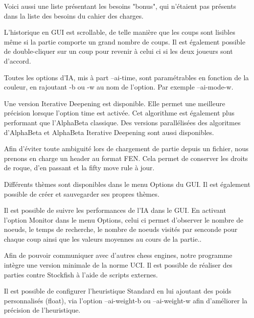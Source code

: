 \documentclass{article}
\begin{document}
Voici aussi une liste présentant les besoins "bonus", qui n'étaient pas présents dans la liste des besoins du cahier des charges.

\begin{needbox}
    L'historique en GUI est scrollable, de telle manière que les coups sont lisibles même si la partie
    comporte un grand nombre de coups. Il est également possible de double-cliquer sur un coup pour revenir à celui ci si les deux joueurs sont d'accord.
\end{needbox}

\begin{needbox}[F62: IA paramétrable]
   Toutes les options d'IA, mis à part --ai-time, sont paramétrables en fonction de la couleur, en rajoutant 
   -b ou -w au nom de l'option. Par exemple --ai-mode-w.
\end{needbox}

\begin{needbox}
   Une version Iterative Deepening est disponible. Elle permet une meilleure précision lorsque l'option time est activée. Cet algorithme est également plus performant que l'AlphaBeta classique.
   Des versions parallélisées des algoritmes d'AlphaBeta et AlphaBeta Iterative Deepening sont aussi disponibles.
\end{needbox}

\begin{needbox}
   Afin d'éviter toute ambiguité lors de chargement de partie depuis un fichier, nous prenons en charge un header au format FEN. Cela permet de conserver les droits de roque, d'en passant et la fifty move rule à jour.
\end{needbox}

\begin{needbox}
    Différents thèmes sont disponibles dans le menu Options du GUI. Il est également possible de créer et sauvegarder ses propres thèmes.
\end{needbox}

\begin{needbox}[F66: Monitoring de l'IA]
    Il est possible de suivre les performances de l'IA dans le GUI. En activant l'option Monitor dans le menu Options, celui ci permet d'observer le nombre de noeuds, le temps de recherche, le nombre de noeuds visités par senconde pour chaque coup ainsi que les valeurs moyennes au cours de la partie..
\end{needbox}

\begin{needbox}
    Afin de pouvoir communiquer avec d'autres chess engines, notre programme intègre une version minimale de la norme UCI. Il est possible de réaliser des parties contre Stockfish à l'aide de scripts externes.
\end{needbox}

\begin{needbox}
    Il est possible de configurer l'heuristique Standard en lui ajoutant des poids personnalisés (float), via l'option --ai-weight-b ou --ai-weight-w afin d'améliorer la précision de l'heuristique.
\end{needbox}
\end{document}
